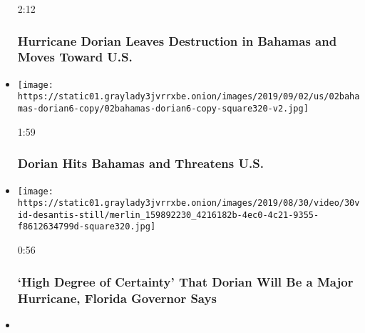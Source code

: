\begin{itemize}
  2:12

  \hypertarget{hurricane-dorian-leaves-destruction-in-bahamas-and-moves-toward-us}{%
  \subsubsection{Hurricane Dorian Leaves Destruction in Bahamas and
  Moves Toward
  U.S.}\label{hurricane-dorian-leaves-destruction-in-bahamas-and-moves-toward-us}}
\item
  \href{https://www.nytimes3xbfgragh.onion/video/us/100000006692573/hurricane-dorian-bahamas.html?action=click\&module=video-series-bar\&region=header\&pgtype=Article\&playlistId=video/extreme-weather}{}

  \texttt{[image: https://static01.graylady3jvrrxbe.onion/images/2019/09/02/us/02bahamas-dorian6-copy/02bahamas-dorian6-copy-square320-v2.jpg]}

  1:59

  \hypertarget{dorian-hits-bahamas-and-threatens-us}{%
  \subsubsection{Dorian Hits Bahamas and Threatens
  U.S.}\label{dorian-hits-bahamas-and-threatens-us}}
\item
  \href{https://www.nytimes3xbfgragh.onion/video/us/100000006690229/hurricane-dorian-desantis.html?action=click\&module=video-series-bar\&region=header\&pgtype=Article\&playlistId=video/extreme-weather}{}

  \texttt{[image: https://static01.graylady3jvrrxbe.onion/images/2019/08/30/video/30vid-desantis-still/merlin\_159892230\_4216182b-4ec0-4c21-9355-f8612634799d-square320.jpg]}

  0:56

  \hypertarget{high-degree-of-certainty-that-dorian-will-be-a-major-hurricane-florida-governor-says}{%
  \subsubsection{`High Degree of Certainty' That Dorian Will Be a Major
  Hurricane, Florida Governor
  Says}\label{high-degree-of-certainty-that-dorian-will-be-a-major-hurricane-florida-governor-says}}
\item
  \href{https://www.nytimes3xbfgragh.onion/video/climate/100000006687979/hurricane-dorian-virgin-islands.html?action=click\&module=video-series-bar\&region=header\&pgtype=Article\&playlistId=video/extreme-weather}{}


\end{itemize}
